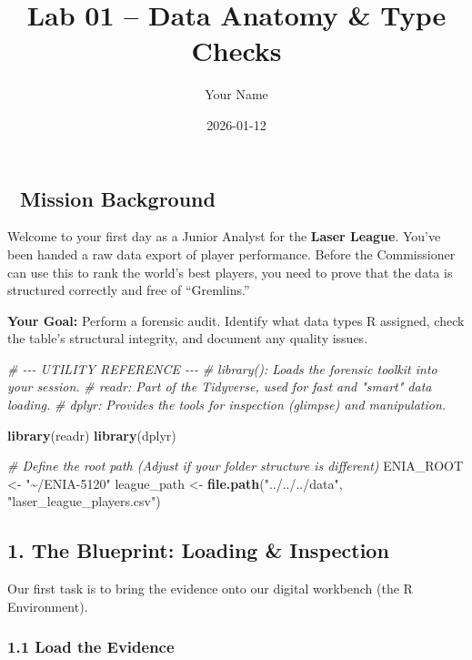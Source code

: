 \documentclass[
]{article}
\title{Lab 01 -- Data Anatomy \& Type Checks}
\author{Your Name}
\date{2026-01-12}
\newenvironment{Shaded}{\begin{snugshade}}{\end{snugshade}}
\newcommand{\CommentTok}[1]{\textcolor[rgb]{0.56,0.35,0.01}{\textit{#1}}}
\newcommand{\FunctionTok}[1]{\textcolor[rgb]{0.13,0.29,0.53}{\textbf{#1}}}
\newcommand{\NormalTok}[1]{#1}
\newcommand{\OtherTok}[1]{\textcolor[rgb]{0.56,0.35,0.01}{#1}}
\newcommand{\StringTok}[1]{\textcolor[rgb]{0.31,0.60,0.02}{#1}}
\begin{document}
\maketitle

{
\setcounter{tocdepth}{2}
\tableofcontents
}
\subsection{🧭 Mission Background}\label{mission-background}

Welcome to your first day as a Junior Analyst for the \textbf{Laser
League}. You've been handed a raw data export of player performance.
Before the Commissioner can use this to rank the world's best players,
you need to prove that the data is structured correctly and free of
``Gremlins.''

\textbf{Your Goal:} Perform a forensic audit. Identify what data types R
assigned, check the table's structural integrity, and document any
quality issues.

\begin{Shaded}
\begin{Highlighting}[]
\CommentTok{\# {-}{-}{-} UTILITY REFERENCE {-}{-}{-}}
\CommentTok{\# library(): Loads the forensic toolkit into your session.}
\CommentTok{\# readr: Part of the Tidyverse, used for fast and "smart" data loading.}
\CommentTok{\# dplyr: Provides the tools for inspection (glimpse) and manipulation.}

\FunctionTok{library}\NormalTok{(readr)}
\FunctionTok{library}\NormalTok{(dplyr)}

\CommentTok{\# Define the root path (Adjust if your folder structure is different)}
\NormalTok{ENIA\_ROOT }\OtherTok{\textless{}{-}} \StringTok{"\textasciitilde{}/ENIA{-}5120"}
\NormalTok{league\_path }\OtherTok{\textless{}{-}} \FunctionTok{file.path}\NormalTok{(}\StringTok{"../../../data"}\NormalTok{, }\StringTok{"laser\_league\_players.csv"}\NormalTok{)}
\end{Highlighting}
\end{Shaded}

\subsection{1. The Blueprint: Loading \&
Inspection}\label{the-blueprint-loading-inspection}

Our first task is to bring the evidence onto our digital workbench (the
R Environment).

\subsubsection{1.1 Load the Evidence}\label{load-the-evidence}
\end{document}
